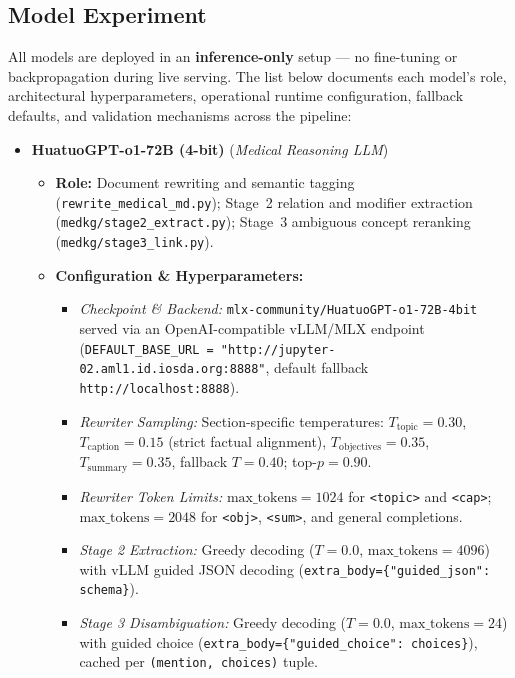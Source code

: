 \subsection*{Model Experiment}

\noindent All models are deployed in an \textbf{inference-only} setup — no fine-tuning or
backpropagation during live serving. The list below documents each model's role, architectural
hyperparameters, operational runtime configuration, fallback defaults, and validation mechanisms
across the pipeline:

{\sloppy
\begin{itemize}
    \item \textbf{HuatuoGPT-o1-72B (4-bit)} (\textit{Medical Reasoning LLM})
    \begin{itemize}
        \item \textbf{Role:} Document rewriting and semantic tagging (\texttt{rewrite\_medical\_md.py}); Stage~2 relation and modifier extraction (\texttt{medkg/stage2\_extract.py}); Stage~3 ambiguous concept reranking (\texttt{medkg/stage3\_link.py}).
        \item \textbf{Configuration \& Hyperparameters:}
        \begin{itemize}[itemsep=1pt,topsep=1pt]
            \item \textit{Checkpoint \& Backend:} \texttt{mlx-community/HuatuoGPT-o1-72B-4bit} served via an OpenAI-compatible vLLM/MLX endpoint (\texttt{DEFAULT\_BASE\_URL = "http://jupyter-02.aml1.id.iosda.org:8888"}, default fallback \texttt{http://localhost:8888}).
            \item \textit{Rewriter Sampling:} Section-specific temperatures: $T_{\text{topic}} = 0.30$, $T_{\text{caption}} = 0.15$ (strict factual alignment), $T_{\text{objectives}} = 0.35$, $T_{\text{summary}} = 0.35$, fallback $T = 0.40$; top-$p = 0.90$.
            \item \textit{Rewriter Token Limits:} $\text{max\_tokens} = 1024$ for \texttt{<topic>} and \texttt{<cap>}; $\text{max\_tokens} = 2048$ for \texttt{<obj>}, \texttt{<sum>}, and general completions.
            \item \textit{Stage 2 Extraction:} Greedy decoding ($T = 0.0$, $\text{max\_tokens} = 4096$) with vLLM guided JSON decoding (\texttt{extra\_body=\allowbreak\{"guided\_json": schema\}}).
            \item \textit{Stage 3 Disambiguation:} Greedy decoding ($T = 0.0$, $\text{max\_tokens} = 24$) with guided choice (\texttt{extra\_body=\allowbreak\{"guided\_choice": choices\}}), cached per \texttt{(mention, choices)} tuple.

\end{itemize}
\end{itemize}
\end{itemize}}
